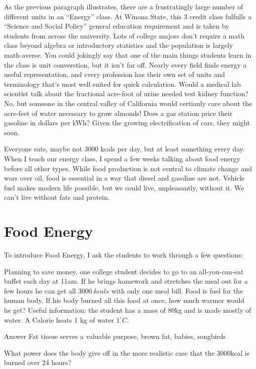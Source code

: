 \documentclass[12pt]{iopart}
\begin{document}
As the previous paragraph illustrates, there are a frustratingly large number of different units in an ``Energy'' class.  At Winona State, this 3 credit class fulfulls a ``Science and Social Policy'' general education requirement and is taken by students from across the university.   Lots of college majors don't require a math class beyond algebra or introductory statistics and the population is largely math-averse. You could jokingly say that one of the main things students learn in the class is unit converstion, but it isn't far off.  Nearly every field finds energy a useful representation, and every profession has their own set of units and terminology that's most well suited for quick calculation.  Would a medical lab scientist talk about the fractional acre-foot of urine needed test kidney function?  No, but someone in the central valley of California would certianly care about the acre-feet of water necessary to grow almonds!  Does a gas station price their gasoline in dollars per kWh? Given the growing electrification of cars, they might soon.

Everyone eats, maybe not 3000 kcals per day, but at least something every day.  When I teach our energy class, I spend a few weeks talking about food energy before all other types.  While food production is not central to climate change and wars over oil, food is essential in a way that diesel and gasoline are not.  Vehicle fuel makes modern life possible, but we could live, unpleasantly, without it.  We can't live without fats and protein.  

\section{Food Energy}

To introduce Food Energy, I ask the students to work through a few questions:

Planning to save money, one college student decides to go to an all-you-can-eat buffet each day at 11am.  If he brings homework and stretches the meal out for a few hours he can get all $3000~kcals$ with only one meal bill.  Food is fuel for the human body. If his body burned all this food at once, how much warmer would he get? 
Useful information: the student has a mass of 80kg and is made mostly of water.  A Calorie heats 1 kg of water $1^{\circ}C$. 

Answer
Fat tissue serves a valuable purpose, brown fat, babies, songbirds

What power does the body give off in the more realistic case that the 3000kcal is burned over 24 hours?
\end{document}
